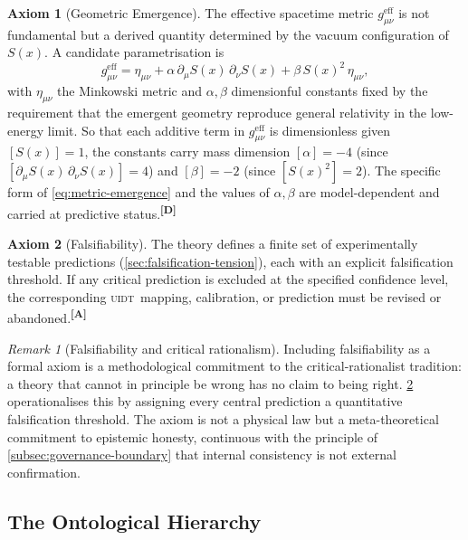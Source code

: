 \documentclass[12pt,a4paper,twoside]{article}
\theoremstyle{plain}
\theoremstyle{definition}
\newtheorem{axiom}{Axiom}
\theoremstyle{remark}
\newtheorem{remark}[theorem]{Remark}
\newcommand{\UIDT}{\textsc{uidt}}
\newcommand{\catmark}[1]{\textsuperscript{\textsf{\textbf{[#1]}}}}
\newcommand{\Sx}{S(x)}
\begin{document}
\begin{axiom}[Geometric Emergence]
\label{ax:emergence}
The effective spacetime metric $g_{\mu\nu}^{\mathrm{eff}}$ is not fundamental but a derived quantity determined by the vacuum configuration of $\Sx$. A candidate parametrisation is
\begin{equation}
 g_{\mu\nu}^{\mathrm{eff}} = \eta_{\mu\nu}
 + \alpha\,\partial_\mu\Sx\,\partial_\nu\Sx
 + \beta\,\Sx^2\,\eta_{\mu\nu},
 \label{eq:metric-emergence}
\end{equation}
with $\eta_{\mu\nu}$ the Minkowski metric and $\alpha,\beta$ dimensionful constants fixed by the requirement that the emergent geometry reproduce general relativity in the low-energy limit. So that each additive term in $g_{\mu\nu}^{\mathrm{eff}}$ is dimensionless given $[\Sx]=1$, the constants carry mass dimension $[\alpha]=-4$ (since $[\partial_\mu\Sx\,\partial_\nu\Sx]=4$) and $[\beta]=-2$ (since $[\Sx^2]=2$). The specific form of \cref{eq:metric-emergence} and the values of $\alpha,\beta$ are model-dependent and carried at predictive status.\catmark{D}
\end{axiom}

\begin{axiom}[Falsifiability]
\label{ax:falsifiability}
The theory defines a finite set of experimentally testable predictions (\cref{sec:falsification-tension}), each with an explicit falsification threshold. If any critical prediction is excluded at the specified confidence level, the corresponding \UIDT\ mapping, calibration, or prediction must be revised or abandoned.\catmark{A}
\end{axiom}

\begin{remark}[Falsifiability and critical rationalism]
\label{rem:popper}
Including falsifiability as a formal axiom is a methodological commitment to the critical-rationalist tradition: a theory that cannot in principle be wrong has no claim to being right. \cref{ax:falsifiability} operationalises this by assigning every central prediction a quantitative falsification threshold. The axiom is not a physical law but a meta-theoretical commitment to epistemic honesty, continuous with the principle of \cref{subsec:governance-boundary} that internal consistency is not external confirmation.
\end{remark}

\subsection{The Ontological Hierarchy}
\label{subsec:ontological-hierarchy}
\end{document}
